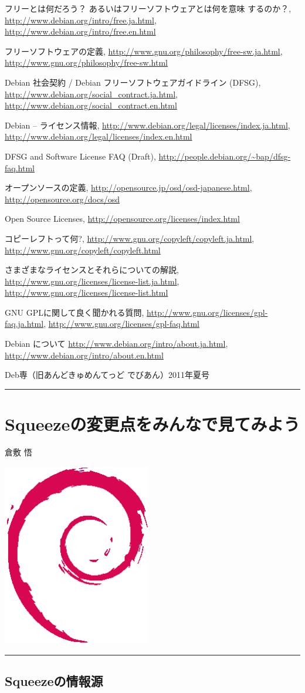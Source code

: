 \documentclass[mingoth,a4paper]{jsarticle}
\renewcommand{\dancersection}[2]{%
\newpage
Deb専（旧あんどきゅめんてっど でびあん）2011年夏号
%
\vspace{0.1mm}\\
{\color{dancerdarkblue}\rule{\hsize}{2mm}}

%
%
\begin{minipage}[t]{0.6\hsize}
\color{dancerdarkblue}
\vspace{1cm}
\section{#1}
\hfill{}#2\\
\end{minipage}
\begin{minipage}[t]{0.4\hsize}
\vspace{-2cm}
\hfill{}\includegraphics[height=8cm]{image200502/openlogo-nd.eps}\\
\vspace{-5cm}
\end{minipage}
%
{\color{dancerlightblue}\rule{0.66\hsize}{2mm}}
%
\vspace{2cm}
}
\begin{document}
\begin{thebibliography}{0}
  フリーとは何だろう？ あるいはフリーソフトウェアとは何を意味
	 するのか？,
\url{http://www.debian.org/intro/free.ja.html},
\url{http://www.debian.org/intro/free.en.html}

  フリーソフトウェアの定義,
\url{http://www.gnu.org/philosophy/free-sw.ja.html},
\url{http://www.gnu.org/philosophy/free-sw.html}

  Debian 社会契約 / Debian フリーソフトウェアガイドライン (DFSG),
\url{http://www.debian.org/social_contract.ja.html},
\url{http://www.debian.org/social_contract.en.html}

  Debian -- ライセンス情報,
\url{http://www.debian.org/legal/licenses/index.ja.html},
\url{http://www.debian.org/legal/licenses/index.en.html}

  DFSG and Software License FAQ (Draft),
\url{http://people.debian.org/~bap/dfsg-faq.html}

  オープンソースの定義,
\url{http://opensource.jp/osd/osd-japanese.html},
\url{http://opensource.org/docs/osd}

  Open Source Licenses,
\url{http://opensource.org/licenses/index.html}

  コピーレフトって何?,
\url{http://www.gnu.org/copyleft/copyleft.ja.html},
\url{http://www.gnu.org/copyleft/copyleft.html}

  さまざまなライセンスとそれらについての解説,
\url{http://www.gnu.org/licenses/license-list.ja.html},
\url{http://www.gnu.org/licenses/license-list.html}

  GNU GPLに関して良く聞かれる質問,
\url{http://www.gnu.org/licenses/gpl-faq.ja.html},
\url{http://www.gnu.org/licenses/gpl-faq.html}

  Debian について
\url{http://www.debian.org/intro/about.ja.html},
\url{http://www.debian.org/intro/about.en.html}

\end{thebibliography}

\dancersection{Squeezeの変更点をみんなで見てみよう}{倉敷 悟}

\subsection{Squeezeの情報源}
\end{document}
